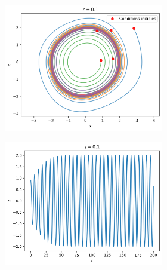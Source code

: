 %
\begin{figure}[t]
    \centering
    \begin{subfigure}[b]{0.9\textwidth}
        \begin{subfigure}[b]{.47\textwidth}
            \includegraphics[width=\textwidth]{images/vdp/vanderpol_small.png}%
            \caption{}
        \end{subfigure}
        \hfill
        \begin{subfigure}[b]{.47\textwidth}
            \includegraphics[width=\textwidth]{images/vdp/vanderpol_small_x.png}%
            \caption{}
        \end{subfigure}

\end{subfigure}
\end{figure}
